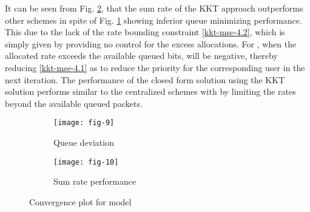 It can be seen from Fig. \ref{fig-d-3.2}, that the sum rate of the  \ac{KKT} approach outperforms other schemes in spite of Fig. \ref{fig-d-3.1} showing inferior queue minimizing performance. This due to the lack of the rate bounding constraint \eqref{kkt-mse-4.2}, which is simply given by  providing no control for the excess allocations. For , when the allocated rate exceeds the available queued bits,  will be negative, thereby reducing \eqref{kkt-mse-4.1} as  to reduce the priority for the corresponding user in the next iteration. The performance of the closed form solution using the \ac{KKT} solution performs similar to the centralized schemes with  by limiting the rates beyond the available queued packets.
\begin{figure*}
\centering
\begin{subfigure}{0.49\textwidth}
\texttt{[image: fig-9]}
\caption{Queue deviation}
\label{fig-d-3.1}
\end{subfigure}
\hfill
\begin{subfigure}{0.49\textwidth}
\texttt{[image: fig-10]}
\caption{Sum rate performance}
\label{fig-d-3.2}
\end{subfigure}
\caption{Convergence plot for  model}
\label{fig-d-3}
\end{figure*}
